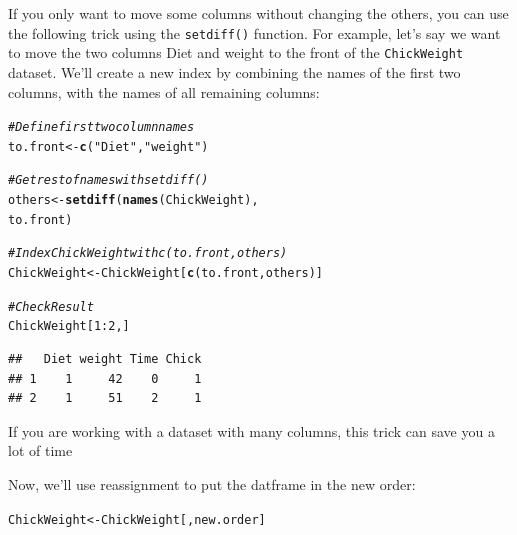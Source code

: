 \documentclass{tufte-book}\usepackage[]{graphicx}\usepackage[]{color}
\makeatletter
\newcommand{\hlnum}[1]{\textcolor[rgb]{0.686,0.059,0.569}{#1}}%
\newcommand{\hlstr}[1]{\textcolor[rgb]{0.192,0.494,0.8}{#1}}%
\newcommand{\hlcom}[1]{\textcolor[rgb]{0.678,0.584,0.686}{\textit{#1}}}%
\newcommand{\hlopt}[1]{\textcolor[rgb]{0,0,0}{#1}}%
\newcommand{\hlstd}[1]{\textcolor[rgb]{0.345,0.345,0.345}{#1}}%
\newcommand{\hlkwb}[1]{\textcolor[rgb]{0.69,0.353,0.396}{#1}}%
\newcommand{\hlkwd}[1]{\textcolor[rgb]{0.737,0.353,0.396}{\textbf{#1}}}%
\newenvironment{kframe}{%
 \def\at@end@of@kframe{}%
 \ifinner\ifhmode%
  \def\at@end@of@kframe{\end{minipage}}%
  \begin{minipage}{\columnwidth}%
 \fi\fi%
 \def\FrameCommand##1{\hskip\@totalleftmargin \hskip-\fboxsep
 \colorbox{shadecolor}{##1}\hskip-\fboxsep
     \hskip-\linewidth \hskip-\@totalleftmargin \hskip\columnwidth}%
 \MakeFramed {\advance\hsize-\width
   \@totalleftmargin\z@ \linewidth\hsize
   \@setminipage}}%
 {\par\unskip\endMakeFramed%
 \at@end@of@kframe}
\newenvironment{knitrout}{}{} %
\makeatother
\begin{document}
\begin{marginfigure}

If you only want to move some columns without changing the others, you can use the following trick using the \texttt{setdiff()} function. For example, let's say we want to move the two columns Diet and weight to the front of the \texttt{ChickWeight} dataset. We'll create a new index by combining the names of the first two columns, with the names of all remaining columns:

\begin{knitrout}
\color{fgcolor}\begin{kframe}
\begin{alltt}
\hlcom{# Define first two column names}
\hlstd{to.front} \hlkwb{<-} \hlkwd{c}\hlstd{(}\hlstr{"Diet"}\hlstd{,} \hlstr{"weight"}\hlstd{)}

\hlcom{# Get rest of names with setdiff()}
\hlstd{others} \hlkwb{<-} \hlkwd{setdiff}\hlstd{(}\hlkwd{names}\hlstd{(ChickWeight),}
                  \hlstd{to.front)}

\hlcom{# Index ChickWeight with c(to.front, others)}
\hlstd{ChickWeight} \hlkwb{<-} \hlstd{ChickWeight[}\hlkwd{c}\hlstd{(to.front, others)]}

\hlcom{# Check Result}
\hlstd{ChickWeight[}\hlnum{1}\hlopt{:}\hlnum{2}\hlstd{,]}
\end{alltt}
\begin{verbatim}
##   Diet weight Time Chick
## 1    1     42    0     1
## 2    1     51    2     1
\end{verbatim}
\end{kframe}
\end{knitrout}

If you are working with a dataset with many columns, this trick can save you a lot of time


\end{marginfigure}


Now, we'll use reassignment to put the datframe in the new order:

\begin{knitrout}
\color{fgcolor}\begin{kframe}
\begin{alltt}
\hlstd{ChickWeight} \hlkwb{<-} \hlstd{ChickWeight[,new.order]}
\end{alltt}
\end{kframe}
\end{knitrout}
\end{document}
